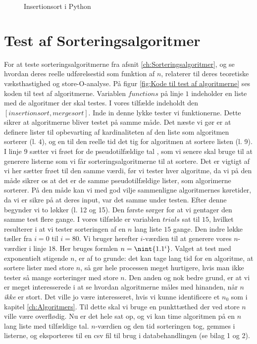 \begin{figure}
	\begin{center}
		
	\end{center}
	\caption{Insertionsort i Python}
	\label{fig:Insertionsort i Python}
\end{figure}

\section{Test af Sorteringsalgoritmer}
\label{sec:Kode til Test af Sorteringsalgoritmer}

For at teste sorteringsalgoritmerne fra afsnit \ref{ch:Sorteringsalgoritmer}, og se hvordan deres reelle udførelsestid som funktion af $n$, relaterer til deres teoretiske væksthastighed og store-O-analyse. På figur \ref{fig:Kode til test af algoritmerne} ses koden til test af algoritmerne. Variablen $functions$ på linje $1$ indeholder en liste med de algoritmer der skal testes. I vores tilfælde indeholdt den $[insertionsort,mergesort]$. Inde in denne lykke tester vi funktionerne. Dette sikrer at algoritmerne bliver testet på samme måde. Det næste vi gør er at definere lister til opbevarting af kardinaliteten af den liste som algoritmen sorterer (l. $4$), og en til den reelle tid det tig for algoritmen at sortere listen (l. 9).  I linje $9$ sætter vi frøet for de pseudotilfældige tal \cite{python-random}, som vi senere skal bruge til at generere listerne som vi får sorteringsalgoritmerne til at sortere. Det er vigtigt af vi her sætter frøet til den samme værdi, før vi tester hver algoritme, da vi på den måde sikrer os at det er de samme pseudotilfældige lister, som algorimerne sorterer. På den måde kan vi med god vilje sammenligne algoritmernes køretider, da vi er sikre på at deres input, var det samme under testen. Efter denne  begynder vi to løkker (l. 12 og 15). Den første sørger for at vi gentager den samme test flere gange. I vores tilfælde er variablen $trials$ sat til $15$, hvilket resulterer i at vi tester sorteringen af en $n$ lang liste $15$ gange. Den indre løkke tæller fra $i=0$ til $i=80$. Vi bruger herefter $i$-værdien til at generere vores $n$-værdier i linje $18$. Her bruges formlen $n=\nint{1.1^i}$. Valget at test med exponentielt stigende $n$, er af to grunde: det kan tage lang tid for en algoritme, at sortere lister med store $n$, så gør hele processen meget hurtigere, hvis man ikke tester så mange sorteringer med store $n$. Den anden og nok bedre grund, er at vi er meget interesserede i at se hvordan algoritmerne måles med hinanden, når $n$ \emph{ikke} er stort. Det ville jo være interesseret, hvis vi kunne identificere et $n_0$ som i kapitel \ref{ch:Algoritmers}. Til dette skal vi bruge en punkttæthed der ved store $n$ ville være overflødig. Nu er det hele sat op, og vi kan time algoritmen på en $n$ lang liste med tilfældige tal. $n$-værdien og den tid sorteringen tog, gemmes i listerne, og eksporteres til en csv fil til brug i databehandlingen (se bilag 1 og 2).




